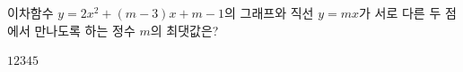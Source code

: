 이차함수 $y=2x^2+(m-3)x+m-1$의 그래프와 직선 $y=mx$가 서로 다른 두 점에서 만나도록 하는 정수 $m$의 최댓값은?
\begin{choices32}{$1$}{$2$}{$3$}{$4$}{$5$}\end{choices32}
